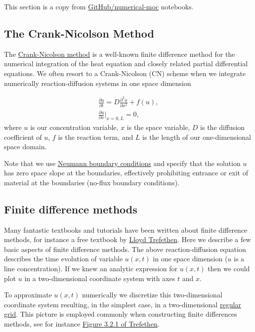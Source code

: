 \documentclass[../summary.tex]{subfiles}
\begin{document}
This section is a copy from \href{https://github.com/numerical-mooc/numerical-mooc}{GitHub/numerical-moc} notebooks.

\subsection{The Crank-Nicolson Method}
The \href{https://en.wikipedia.org/wiki/Crank%E2%80%93Nicolson_method}{Crank-Nicolson method} is a well-known finite difference method for the numerical integration of the heat equation and closely related partial differential equations. We often resort to a Crank-Nicolson (CN) scheme when we integrate numerically reaction-diffusion systems in one space dimension

\begin{align*}
\frac{\partial u}{\partial t} = D \frac{\partial^2 u}{\partial x^2} + f(u),\\
\frac{\partial u}{\partial x}\Bigg|_{x = 0, L} = 0,
\end{align*}
where $u$ is our concentration variable, $x$ is the space variable, $D$ is the diffusion coefficient of $u$, $f$ is the reaction term, and $L$ is the length of our one-dimensional space domain.

Note that we use \href{http://en.wikipedia.org/wiki/Neumann_boundary_condition}{Neumann boundary conditions} and specify that the solution $u$ has zero space slope at the boundaries, effectively prohibiting entrance or exit of material at the boundaries (no-flux boundary conditions).

\subsection{Finite difference methods}

Many fantastic textbooks and tutorials have been written about finite difference methods, for instance a free textbook by \href{http://people.maths.ox.ac.uk/trefethen/pdetext.html}{Lloyd Trefethen}.
Here we describe a few basic aspects of finite difference methods. The above reaction-diffusion equation describes the time evolution of variable $u(x,t)$ in one space dimension ($u$ is a line concentration).
If we knew an analytic expression for $u(x,t)$ then we could plot $u$ in a two-dimensional coordinate system with axes $t$ and $x$.

To approximate $u(x,t)$ numerically we discretize this two-dimensional coordinate system resulting, in the simplest case, in a two-dimensional \href{http://en.wikipedia.org/wiki/Regular_grid}{regular grid}.
This picture is employed commonly when constructing finite differences methods, see for instance 
\href{http://people.maths.ox.ac.uk/trefethen/3all.pdf}{Figure 3.2.1 of Trefethen}.
\end{document}
